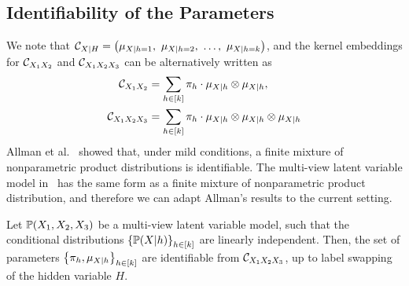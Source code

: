 \documentclass{article}
\begin{document}
\subsection{Identifiability of the Parameters}

We note that $\mathcal{C}_{X|H} = \left(\mu_{X|h=1},\ \mu_{X|h=2},\ \ldots,\ \mu_{X|h=k}\right)$, and the kernel embeddings for $\mathcal{C}_{X_1 X_2}$ and $\mathcal{C}_{X_1 X_2 X_3}$ can be alternatively written as
\begin{align}
	\mathcal{C}_{X_1 X_2}
  & = \sum_{h \in [k]} \pi_h\cdot \mu_{X|h} \otimes \mu_{X|h}, \label{eq:joint2} \\
  \mathcal{C}_{X_1 X_2 X_3}
  &= \sum_{h \in [k]} \pi_h\cdot \mu_{X|h} \otimes \mu_{X|h} \otimes \mu_{X|h} \label{eq:joint3}
\end{align}
Allman et al.~\cite{x} showed that, under mild conditions, a finite mixture of nonparametric product distributions is identifiable. The multi-view latent variable model in~ has the same form as a finite mixture of nonparametric product distribution, and therefore we can adapt Allman's results to the current setting.
\begin{theorem}
  Let $\mathbb{P}(X_1,X_2,X_3)$ be a multi-view latent variable model, such that the conditional distributions $\left\{\mathbb{P}(X|h)\right\}_{h \in [k]}$ are linearly independent. Then, the set of parameters $\left\{\pi_h, \mu_{X|h}\right\}_{h \in [k]}$ are identifiable from $\mathcal{C}_{X_1 X_2 X_3}$, up to label swapping of the hidden variable $H$.
\end{theorem}


\end{document}
